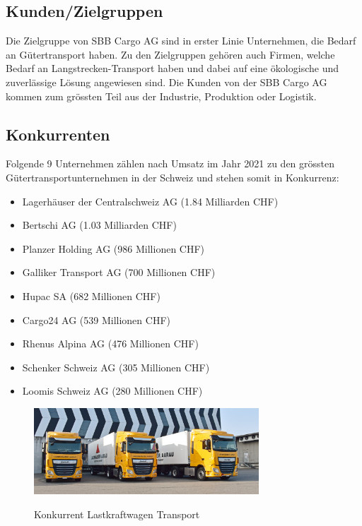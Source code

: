 \documentclass{article}
\begin{document}
\subsection{Kunden/Zielgruppen}

Die Zielgruppe von SBB Cargo AG sind in erster Linie Unternehmen, die Bedarf an Gütertransport haben.
Zu den Zielgruppen gehören auch Firmen, welche Bedarf an Langstrecken-Transport haben und dabei auf eine ökologische und zuverlässige Lösung angewiesen sind.
Die Kunden von der SBB Cargo AG kommen zum grössten Teil aus der Industrie, Produktion oder Logistik.

\cleardoublepage
\subsection{Konkurrenten}
Folgende 9 Unternehmen zählen nach Umsatz im Jahr 2021 zu den grössten Gütertransportunternehmen in der Schweiz und stehen somit in Konkurrenz:
\begin{itemize}
\item Lagerhäuser der Centralschweiz AG (1.84 Milliarden CHF)
\item Bertschi AG (1.03 Milliarden CHF)
\item Planzer Holding AG (986 Millionen CHF)
\item Galliker Transport AG (700 Millionen CHF)
\item Hupac SA (682 Millionen CHF)
\item Cargo24 AG (539 Millionen CHF)
\item Rhenus Alpina AG (476 Millionen CHF)
\item Schenker Schweiz AG (305 Millionen CHF)
\item Loomis Schweiz AG (280 Millionen CHF)
\end{itemize}
\parencite[o. S.]{groessteUnternehmenGuetertransport}

\begin{figure}[htbp] %
    \centering
    \includegraphics[width=0.75\textwidth]{konkurenz} %
    \caption{Konkurrent Lastkraftwagen Transport}\parencite[o. S.]{konkurenzBild}
    \label{fig:bildlabel5}
\end{figure}
\end{document}
